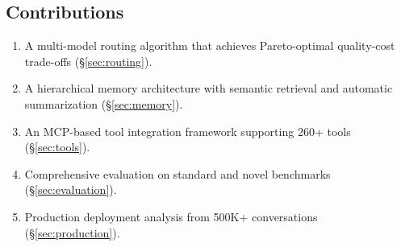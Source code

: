 \subsection{Contributions}

\begin{enumerate}[leftmargin=1.4em]
    \item A multi-model routing algorithm that achieves Pareto-optimal quality-cost trade-offs (\S\ref{sec:routing}).
    \item A hierarchical memory architecture with semantic retrieval and automatic summarization (\S\ref{sec:memory}).
    \item An MCP-based tool integration framework supporting 260+ tools (\S\ref{sec:tools}).
    \item Comprehensive evaluation on standard and novel benchmarks (\S\ref{sec:evaluation}).
    \item Production deployment analysis from 500K+ conversations (\S\ref{sec:production}).
\end{enumerate}

